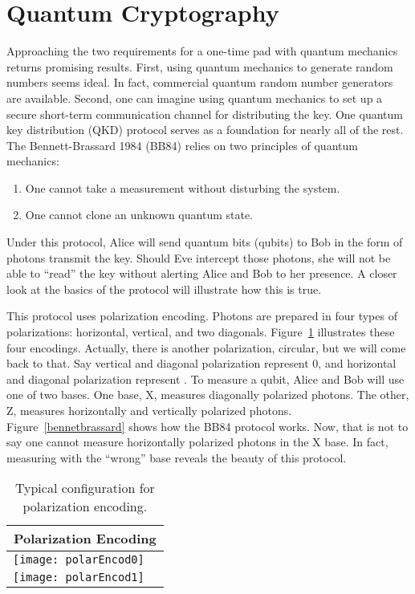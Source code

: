 \documentclass[12pt,twocolumn]{article}
\begin{document}
\section{Quantum Cryptography}
Approaching the two requirements for a one-time pad with quantum mechanics returns promising results. First, using quantum mechanics to generate random numbers seems ideal\cite{bell:64}. In fact, commercial quantum random number generators are available\cite{idQ}. Second, one can imagine using quantum mechanics to set up a secure short-term communication channel for distributing the key. One quantum key distribution (QKD) protocol serves as a foundation for nearly all of the rest. The Bennett-Brassard 1984 (BB84) relies on two principles of quantum mechanics:
\begin{enumerate}
\item One cannot take a measurement without disturbing the system.
\item One cannot clone an unknown quantum state.
\end{enumerate}
Under this protocol, Alice will send quantum bits (qubits) to Bob in the form of photons transmit the key. Should Eve intercept those photons, she will not be able to ``read'' the key without alerting Alice and Bob to her presence. A closer look at the basics of the protocol will illustrate how this is true.

This protocol uses polarization encoding.
Photons are prepared in four types of polarizations: horizontal, vertical, and two diagonals. Figure~\ref{pe} illustrates these four encodings. Actually, there is another polarization, circular, but we will come back to that. Say vertical and  diagonal polarization represent 0, and horizontal and  diagonal polarization represent . To measure a qubit, Alice and Bob will use one of two bases. One base, X, measures diagonally polarized photons. The other, Z, measures horizontally and vertically polarized photons. Figure~\ref{bennetbrassard} shows how the BB84 protocol works. Now, that is not to say one cannot measure horizontally polarized photons in the X base. In fact, measuring with the “wrong” base reveals the beauty of this protocol.
\begin{table}[hbp]
\begin{tabular}{|c|c|}
\hline
\multicolumn{2}{|c|}{Polarization Encoding}\\
\hline
\texttt{[image: polarEncod0]} &  \\
\hline
\texttt{[image: polarEncod1]} &  \\
\hline
\end{tabular}
\caption{Typical configuration for polarization encoding.\label{pe}}
\end{table}
\end{document}
